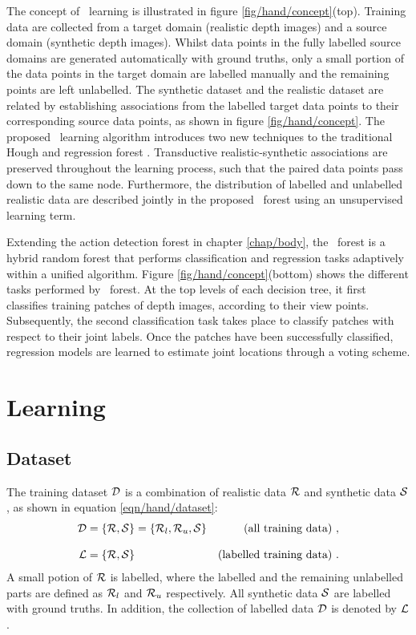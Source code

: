 The concept of \STR\ learning is illustrated in figure \ref{fig/hand/concept}(top). 
Training data are collected from a target domain (realistic depth images) and a source domain (synthetic depth images). Whilst data points in the fully labelled source domains are generated automatically with ground truths, only a small portion of the data points in the target domain are labelled manually and the remaining points are left unlabelled. 
The synthetic dataset and the realistic dataset are related by establishing associations from the labelled target data points to their corresponding source data points, as shown in figure \ref{fig/hand/concept}. The proposed \STR\ learning algorithm introduces two new techniques to the traditional Hough and regression forest \cite{Gall2011}. 
Transductive realistic-synthetic associations are preserved throughout the learning process, such that the paired data points pass down to the same node. 
Furthermore, the distribution of labelled and unlabelled realistic data are described jointly in the proposed \STR\ forest using an unsupervised learning term. 

Extending the action detection forest in chapter \ref{chap/body}, the \STR\ forest is a hybrid random forest that performs classification and regression tasks adaptively within a unified algorithm. Figure \ref{fig/hand/concept}(bottom) shows the different tasks performed by \STR\ forest. At the top levels of each decision tree, it first classifies training patches of depth images, according to their view points. Subsequently, the second classification task takes place to classify patches with respect to their joint labels. Once the patches have been successfully classified, regression models are learned to estimate joint locations through a voting scheme.  

\section{Learning} 

\subsection{Dataset}
\label{sec/hand/dataset} 

The training dataset $\mathcal{D}$ is a combination of realistic data $\mathcal{R}$ and synthetic data $\mathcal{S}$, as shown in equation \ref{eqn/hand/dataset}: 
\begin{equation}
	\label{eqn/hand/dataset} 
	\begin{aligned}
		\mathcal{D} 	& = \left\{ \mathcal{R}, \mathcal{S} \right\} = \left\{ \mathcal{R}_{l}, \mathcal{R}_{u}, \mathcal{S} \right\} & \mbox{(all training data) }, \\[3mm]
		\mathcal{L} 		& = \left\{ \mathcal{R}, \mathcal{S} \right\} & \mbox{(labelled training data) }. \\ 
	\end{aligned}
\end{equation}
A small potion of $\mathcal{R}$ is labelled, where the labelled and the remaining unlabelled parts are defined as $\mathcal{R}_{l}$ and $\mathcal{R}_{u}$ respectively. All synthetic data $\mathcal{S}$ are labelled with ground truths. In addition, the collection of labelled data $\mathcal{D}$ is denoted by $\mathcal{L}$.  

